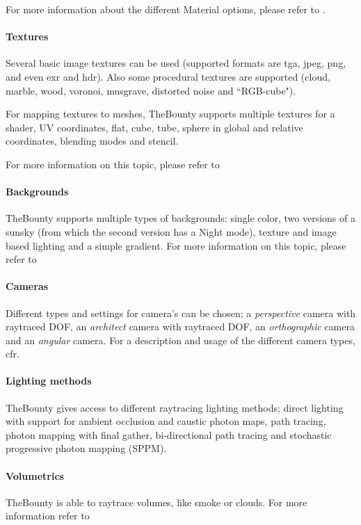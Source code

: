 For more information about the different Material options, please refer to .

\paragraph{Textures} Several basic image textures can be used (supported formats are tga, jpeg, png, and even exr and hdr). Also some procedural textures are supported (cloud, marble, wood, voronoi, musgrave, distorted     noise and ``RGB-cube").

For mapping textures to meshes, TheBounty supports multiple textures for a shader, UV coordinates, flat, cube, tube, sphere in global and relative coordinates, blending modes and stencil.  

For more information on this topic, please refer to 

\paragraph{Backgrounds} TheBounty supports multiple types of backgrounds: single color, two versions of a sunsky (from which the second version has a Night mode), texture and image based lighting and a simple gradient. For more information on this topic, please refer to 

\paragraph{Cameras} Different types and settings for camera's can be chosen; a \textit{perspective} camera with raytraced DOF, an \textit{architect} camera with raytraced DOF, an \textit{orthographic} camera and an \textit{angular} camera. For a description and usage of the different camera types, cfr. 

\paragraph{Lighting methods} TheBounty gives access to different raytracing lighting methods; direct lighting with support for ambient occlusion and caustic photon maps, path tracing, photon mapping with final gather, bi-directional path tracing and stochastic progressive photon mapping (SPPM).

\paragraph{Volumetrics} TheBounty is able to raytrace volumes, like smoke or clouds. For more information refer to 

